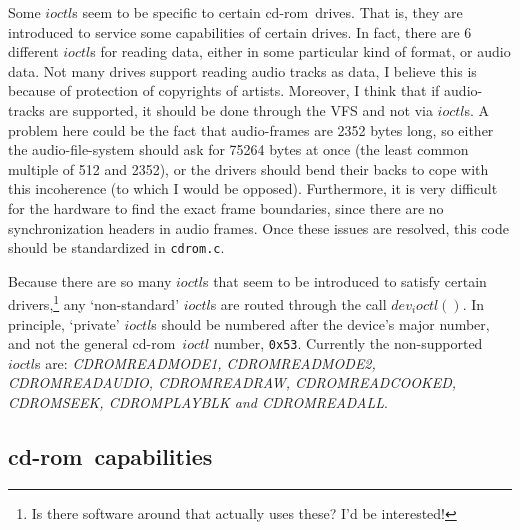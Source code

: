 \documentclass{article}
\def\cdrom{{\sc cd-rom}}
\def\cdromc{{\tt {cdrom.c}}}
\begin{document}
Some $ioctl$s seem to be specific to certain \cdrom\ drives. That is,
they are introduced to service some capabilities of certain drives. In
fact, there are 6 different $ioctl$s for reading data, either in some
particular kind of format, or audio data. Not many drives support
reading audio tracks as data, I believe this is because of protection
of copyrights of artists. Moreover, I think that if audio-tracks are
supported, it should be done through the VFS and not via $ioctl$s. A
problem here could be the fact that audio-frames are 2352 bytes long,
so either the audio-file-system should ask for 75264 bytes at once
(the least common multiple of 512 and 2352), or the drivers should
bend their backs to cope with this incoherence (to which I would be
opposed).  Furthermore, it is very difficult for the hardware to find
the exact frame boundaries, since there are no synchronization headers
in audio frames.  Once these issues are resolved, this code should be
standardized in \cdromc.

Because there are so many $ioctl$s that seem to be introduced to
satisfy certain drivers,\footnote{Is there software around that
  actually uses these? I'd be interested!} any `non-standard' $ioctl$s
are routed through the call $dev_ioctl()$. In principle, `private'
$ioctl$s should be numbered after the device's major number, and not
the general \cdrom\ $ioctl$ number, {\tt {0x53}}. Currently the
non-supported $ioctl$s are: {\it CDROMREADMODE1, CDROMREADMODE2,
  CDROMREADAUDIO, CDROMREADRAW, CDROMREADCOOKED, CDROMSEEK,
  CDROMPLAY\-BLK and CDROM\-READALL}.


\subsection{\cdrom\ capabilities}
\label{capability}
\end{document}
